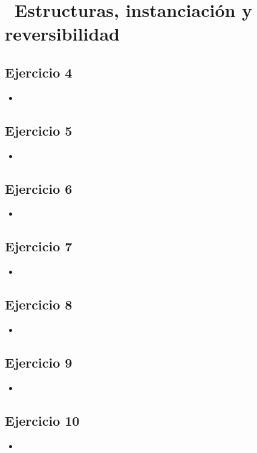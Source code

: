\documentclass[10pt,a4paper]{article}
\begin{document}
\section*{\ Estructuras, instanciación y reversibilidad}

\subsection{Ejercicio 4}
\begin{itemize}
\item
\end{itemize}

\subsection{Ejercicio 5}
\begin{itemize}
\item
\end{itemize}

\subsection{Ejercicio 6}
\begin{itemize}
\item
\end{itemize}

\subsection{Ejercicio 7}
\begin{itemize}
\item
\end{itemize}

\subsection{Ejercicio 8}
\begin{itemize}
\item
\end{itemize}

\subsection{Ejercicio 9}
\begin{itemize}
\item
\end{itemize}

\subsection{Ejercicio 10}
\begin{itemize}
\item
\end{itemize}
\end{document}
